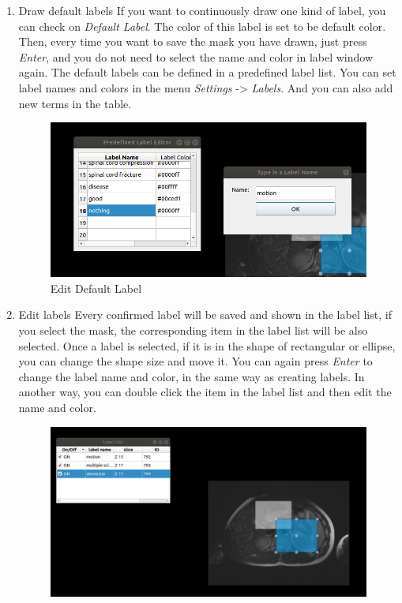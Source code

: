\documentclass[12pt]{article}
\begin{document}
\begin{enumerate}
\begin{figure}[htbp]
	\end{figure}
	\item Draw default labels
	\newline If you want to continuously draw one kind of label, you can check on \textit{Default Label}. The color of this label is set to be default color. Then, every time you want to save the mask you have drawn, just press \textit{Enter}, and you do not need to select the name and color in label window again. The default labels can be defined in a predefined label list. You can set label names and colors in the menu \textit{Settings} -> \textit{Labels}. And you can also add new terms in the table.
	\begin{figure}[htbp]	
		\centering
		\includegraphics[width=\linewidth]{edit_default_label.png}
		\caption[Edit Default Label]{Edit Default Label}
		\label{fig:edit_default_label}
	\end{figure}
	\item Edit labels
	\newline Every confirmed label will be saved and shown in the label list, if you select the mask, the corresponding item in the label list will be also selected. Once a label is selected, if it is in the shape of rectangular or ellipse, you can change the shape size and move it. You can again press \textit{Enter} to change the label name and color, in the same way as creating labels. In another way, you can double click the item in the label list and then edit the name and color.
	\begin{figure}[htbp]	
		\centering
		\includegraphics[width=\linewidth]{edit_label.png}

\end{figure}
\end{enumerate}
\end{document}
